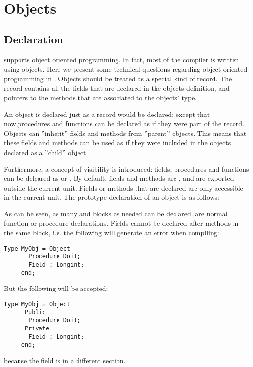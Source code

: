 
\chapter{Objects}
\label{ch:Objects}

\section{Declaration}
\fpc supports object oriented programming. In fact, most  of the compiler is
written using objects. Here we present some technical questions regarding
object oriented programming in \fpc.
Objects should be treated as a special kind of record. The record contains
all the fields that are declared in the objects definition, and pointers
to the methods that are associated to the objects' type.

An object is declared just as a record would be declared; except that
now,procedures and functions can be declared as if they were part of the record.
Objects can ''inherit'' fields and methods from ''parent'' objects. This means
that these fields and methods can be used as if they were included in the
objects declared as a ''child'' object.

Furthermore, a concept of visibility is introduced: fields, procedures and functions
can be delcared as  or . By default, fields and
methods are , and are
exported outside the current unit. Fields or methods that are declared
 are only accessible in the current unit.
The prototype declaration of an object is as follows:

As can be seen, as many  and  blocks as needed can be
declared.
 are normal function or procedure declarations.
Fields cannot be declared after methods in the same block, i.e. the following
will generate an error when compiling:
\begin{verbatim}
Type MyObj = Object
       Procedure Doit;
       Field : Longint;
     end;
\end{verbatim}
But the following will be accepted:
\begin{verbatim}
Type MyObj = Object
      Public
       Procedure Doit;
      Private
       Field : Longint;
     end;
\end{verbatim}
because the field is in a different section.

